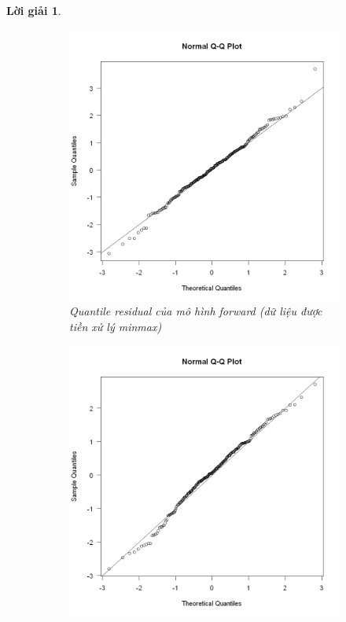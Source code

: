 \documentclass[14pt, a4paper]{article}
\theoremstyle{sltheorem}
\theoremstyle{soltheorem}
\newtheorem*{loigiai}{Lời giải}
\begin{document}
\begin{loigiai}
    \begin{figure}[h!]
        \centering
        \begin{subfigure}[b]{0.4\textwidth}
            \centering
            \includegraphics[width=\textwidth]{figures/minmax_mf_quantile_resid.png}
            \caption{Quantile residual của mô hình forward (dữ liệu được tiền xử lý minmax)}
        \end{subfigure}
        \hfill
        \begin{subfigure}[b]{0.4\textwidth}
            \centering
            \includegraphics[width=\textwidth]{figures/standardize_mf_quantile_resid.png}

\end{subfigure}
\end{figure}
\end{loigiai}
\end{document}
